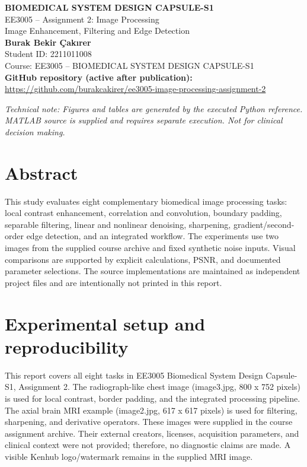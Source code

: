 \documentclass[10pt,a4paper]{article}
\begin{document}
\begin{center}
{\LARGE\bfseries BIOMEDICAL SYSTEM DESIGN CAPSULE-S1}\\[7pt]
{\large EE3005 -- Assignment 2: Image Processing}\\[5pt]
{\large Image Enhancement, Filtering and Edge Detection}\\[13pt]
{\bfseries Burak Bekir Çakırer}\\
Student ID: 2211011008\\
Course: EE3005 -- BIOMEDICAL SYSTEM DESIGN CAPSULE-S1\\[8pt]
\textbf{GitHub repository (active after publication):}\\
\url{https://github.com/burakcakirer/ee3005-image-processing-assignment-2}
\end{center}
\smallskip
\noindent\textit{Technical note: Figures and tables are generated by the executed Python reference. MATLAB source is supplied and requires separate execution. Not for clinical decision making.}
\tableofcontents
\newpage
\section{Abstract}
This study evaluates eight complementary biomedical image processing tasks: local contrast enhancement, correlation and convolution, boundary padding, separable filtering, linear and nonlinear denoising, sharpening, gradient/second-order edge detection, and an integrated workflow. The experiments use two images from the supplied course archive and fixed synthetic noise inputs. Visual comparisons are supported by explicit calculations, PSNR, and documented parameter selections. The source implementations are maintained as independent project files and are intentionally not printed in this report.

\section{Experimental setup and reproducibility}
This report covers all eight tasks in EE3005 Biomedical System Design Capsule-S1, Assignment 2. The radiograph-like chest image (image3.jpg, 800 x 752 pixels) is used for local contrast, border padding, and the integrated processing pipeline. The axial brain MRI example (image2.jpg, 617 x 617 pixels) is used for filtering, sharpening, and derivative operators. These images were supplied in the course assignment archive. Their external creators, licenses, acquisition parameters, and clinical context were not provided; therefore, no diagnostic claims are made. A visible Kenhub logo/watermark remains in the supplied MRI image.
\end{document}
